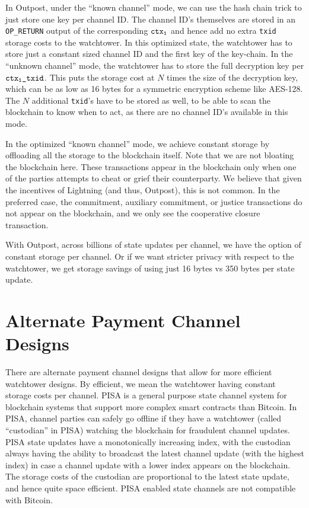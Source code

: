 In Outpost, under the ``known channel'' mode, we can use the hash chain trick to just store one key per channel ID. The channel ID's themselves are stored in an \texttt{OP\_RETURN} output of the corresponding $\texttt{ctx\textsubscript{1}}$ and hence add no extra \texttt{txid} storage costs to the watchtower. In this optimized state, the watchtower has to store just a constant sized channel ID and the first key of the key-chain. In the ``unknown channel'' mode, the watchtower has to store the full decryption key per $\texttt{ctx\textsubscript{1}\_txid}$. This puts the storage cost at $N$ times the size of the decryption key, which can be as low as 16 bytes for a symmetric encryption scheme like AES-128. The $N$ additional \texttt{txid}'s have to be stored as well, to be able to scan the blockchain to know when to act, as there are no channel ID's available in this mode.

In the optimized ``known channel'' mode, we achieve constant storage by offloading all the storage to the blockchain itself. Note that we are not bloating the blockchain here. These transactions appear in the blockchain only when one of the parties attempts to cheat or grief their counterparty. We believe that given the incentives of Lightning (and thus, Outpost), this is not common. In the preferred case, the commitment, auxiliary commitment, or justice transactions do not appear on the blockchain, and we only see the cooperative closure transaction.

With Outpost, across billions of state updates per channel, we have the option of constant storage per channel. Or if we want stricter privacy with respect to the watchtower, we get storage savings of using just 16 bytes vs 350 bytes per state update.

\section {Alternate Payment Channel Designs}
There are alternate payment channel designs that allow for more efficient watchtower designs. By efficient, we mean the watchtower having constant storage costs per channel. PISA \cite{pisa} is a general purpose state channel system for blockchain systems that support more complex smart contracts than Bitcoin. In PISA, channel parties can safely go offline if they have a watchtower (called ``custodian'' in PISA) watching the blockchain for fraudulent channel updates. PISA state updates have a monotonically increasing index, with the custodian always having the ability to broadcast the latest channel update (with the highest index) in case a channel update with a lower index appears on the blockchain. The storage costs of the custodian are proportional to the latest state update, and hence quite space efficient. PISA enabled state channels are not compatible with Bitcoin.

